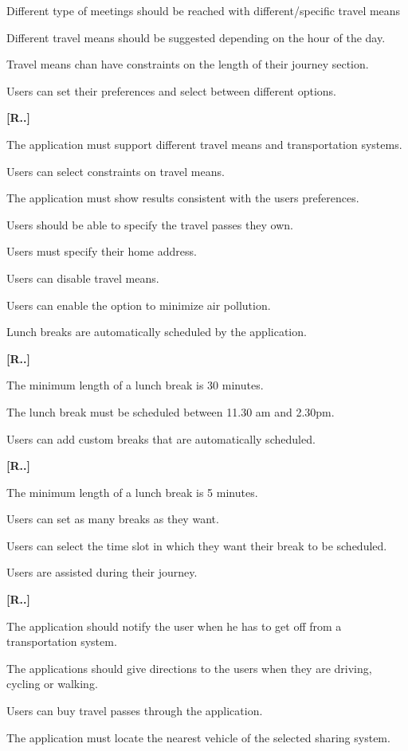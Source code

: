 \begin{list}
\begin{list}
\item Different type of meetings should be reached with different/specific travel means
\item Different travel means should be suggested depending on the hour of the day.
\item Travel means chan have constraints on the length of their journey section.
\end{list}
\item Users can set their preferences and select between different options.
\begin{list}
	{\bfseries{}[R..]~}
	{
	}
\item The application must support different travel means and transportation systems.
\item Users can select constraints on travel means.
\item The application must show results consistent with the users preferences.
\item Users should be able to specify the travel passes they own.
\item Users must specify their home address.
	\item Users can disable travel means.
	\item Users can enable the option to minimize air pollution.
    \end{list}
\item Lunch breaks are automatically scheduled by the application.
\begin{list}
	{\bfseries{}[R..]~}
	{
	}
\item The minimum length of a lunch break is 30 minutes.
\item The lunch break must be scheduled between 11.30 am and 2.30pm.
\end{list}
\item Users can add custom breaks that are automatically scheduled.
\begin{list}
	{\bfseries{}[R..]~}
	{
	}
\item The minimum length of a lunch break is 5 minutes.
\item Users can set as many breaks as they want.
\item Users can select the time slot in which they want their break to be scheduled.
\end{list}
\item Users are assisted during their journey.
\begin{list}
	{\bfseries{}[R..]~}
	{
	}
\item The application should notify the user when he has to get off from a transportation system.
\item The applications should give directions to the users when they are driving, cycling or walking.
\item Users can buy travel passes through the application.
\item The application must locate the nearest vehicle of the selected sharing system.
\end{list}



\end{list}
